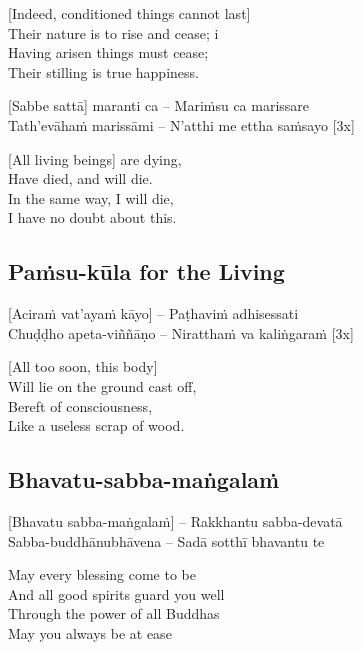 \begin{english}
  [Indeed, conditioned things cannot last]\\
  Their nature is to rise and cease; i\\
  Having arisen things must cease;\\
  Their stilling is true happiness.
\end{english}

\suttaRef{[DN 16]}

[Sabbe sattā] maranti ca – Mariṁsu ca marissare\\
Tath’evāhaṁ marissāmi – N’atthi me ettha saṁsayo \hfill{[3x]}

\begin{english}
  [All living beings] are dying,\\
  Have died, and will die.\\
  In the same way, I will die,\\
  I have no doubt about this.
\end{english}

\suttaRef{[Thai]}

\subsection{Paṁsu-kūla for the Living}
\label{pamsu-kula-living}
[Aciraṁ vat’ayaṁ kāyo] – Paṭhaviṁ adhisessati\\
Chuḍḍho apeta-viññāṇo – Niratthaṁ va kaliṅgaraṁ \hfill{[3x]}

\begin{english}
  [All too soon, this body]\\
  Will lie on the ground cast off,\\
  Bereft of consciousness,\\
  Like a useless scrap of wood.
\end{english}

\suttaRef{[Dhp 41]}

\subsection{Bhavatu-sabba-maṅgalaṁ}
\label{bhavtu}
[Bhavatu sabba-maṅgalaṁ] – Rakkhantu sabba-devatā\\
Sabba-buddhānubhāvena – Sadā sotthī bhavantu te

\begin{english}
  May every blessing come to be\\
  And all good spirits guard you well\\
  Through the power of all Buddhas\\
  May you always be at ease
\end{english}

